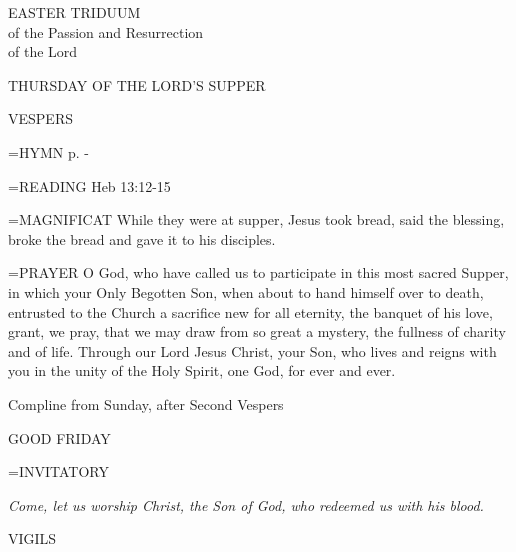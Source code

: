 \begin{center}\normalsize EASTER TRIDUUM\\
\footnotesize of the Passion and Resurrection\\
\footnotesize of the Lord\\
\end{center}

\begin{center}
\normalsize THURSDAY OF THE LORD'S SUPPER
\end{center}

\begin{flushleft}\normalsize VESPERS\\\end{flushleft}

\hangindent=\parindent \small{\uppercase{HYMN} p.  \pageref{holyweek:firstHymn} - \pageref{holyweek:lastHymn}\\}

\hangindent=\parindent \small{READING}    Heb 13:12-15 \textbf{   \\}

\hangindent=\parindent \small{MAGNIFICAT 	While they were at supper, Jesus took bread, said the blessing, broke the bread and gave it to his disciples.\\}

\hangindent=\parindent \small{PRAYER 	O God, who have called us to participate in this most sacred Supper, in which your Only Begotten Son, when about to hand himself over to death, entrusted to the Church a sacrifice new for all eternity, the banquet of his love, grant, we pray, that we may draw from so great a mystery, the fullness of charity and of life. Through our Lord Jesus Christ, your Son, who lives and reigns with you in the unity of the Holy Spirit, one God, for ever and ever.}

Compline from Sunday, after Second Vespers

\begin{center}
\normalsize GOOD FRIDAY
\end{center}

\hangindent=\parindent \small{INVITATORY}
\begin{center}
\textit{Come, let us worship Christ, the Son of God, who redeemed us with his blood.\\}
\end{center}

\begin{flushleft}\normalsize VIGILS\\\end{flushleft}

